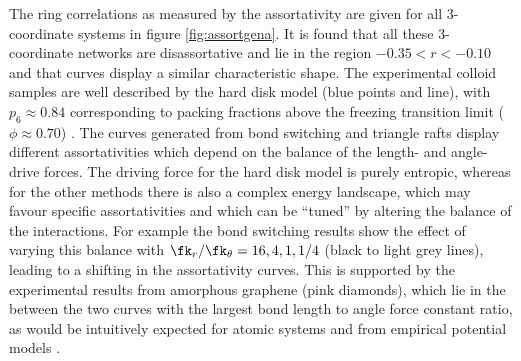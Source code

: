 The ring correlations as measured by the assortativity are given for all 3\-- coordinate systems in figure \ref{fig:assortgena}.
It is found that all these 3\-- coordinate networks are disassortative and lie in the region $-0.35<r<-0.10$ and that curves display a similar characteristic shape.
The experimental colloid samples are well described by the hard disk model (blue points and line), with $p_6\approx0.84$ corresponding to packing fractions above the freezing transition limit ($\phi\approx 0.70$) \cite{Bernard2011}.
The curves generated from bond switching and triangle rafts display different assortativities which depend on the balance of the length\-- and angle\--drive forces.
The driving force for the hard disk model is purely entropic, whereas for the other methods there is also a complex energy landscape, which may favour specific assortativities and which can be ``tuned'' by altering the balance of the interactions. 
For example the bond switching results show the effect of varying this balance with $\fk_r/\fk_\theta=16,4,1,1/4$ (black to light grey lines), leading to a shifting in the assortativity curves.
This is supported by the experimental results from amorphous graphene (pink diamonds), which lie in the between the two curves with the largest bond length to angle force constant ratio, as would be intuitively expected for atomic systems and from empirical potential models \cite{Kumar2012}.

